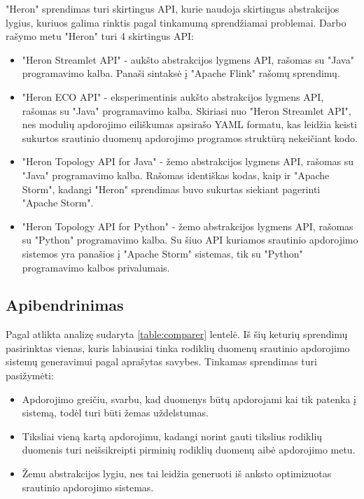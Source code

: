 \documentclass{VUMIFPSbakalaurinis}
\begin{document}
"Heron" sprendimas turi skirtingus API, kurie naudoja skirtingus abstrakcijos lygius, kuriuos galima rinktis pagal tinkamumą sprendžiamai problemai. Darbo rašymo metu "Heron" turi 4 skirtingus API:
\begin{itemize}
    \item "Heron Streamlet API" - aukšto abstrakcijos lygmens API, rašomas su "Java" programavimo kalba. Panaši sintaksė į "Apache Flink" rašomų sprendimų.
    \item "Heron ECO API" - eksperimentinis aukšto abstrakcijos lygmens API, rašomas su "Java" programavimo kalba. Skiriasi nuo "Heron Streamlet API", nes modulių apdorojimo eiliškumas apsirašo YAML formatu, kas leidžia keisti sukurtos srautinio duomenų apdorojimo programos struktūrą nekeičiant kodo.
    \item "Heron Topology API for Java" - žemo abstrakcijos lygmens API, rašomas su "Java" programavimo kalba. Rašomas identiškas kodas, kaip ir "Apache Storm", kadangi "Heron" sprendimas buvo sukurtas siekiant pagerinti "Apache Storm".
    \item "Heron Topology API for Python" - žemo abstrakcijos lygmens API, rašomas su "Python" programavimo kalba. Su šiuo API kuriamos srautinio apdorojimo sistemos yra panašios į "Apache Storm" sistemas, tik su "Python" programavimo kalbos privalumais.
\end{itemize}  


\subsection{Apibendrinimas}

Pagal atlikta analizę sudaryta \ref{table:comparer} lentelė. Iš šių keturių sprendimų pasirinktas vienas, kuris labiausiai tinka rodiklių duomenų srautinio apdorojimo sistemų generavimui pagal aprašytas savybes. Tinkamas sprendimas turi pasižymėti: 
\begin{itemize}
    \item Apdorojimo greičiu, svarbu, kad duomenys būtų apdorojami kai tik patenka į sistemą, todėl turi būti žemas uždelstumas.
    \item Tiksliai vieną kartą apdorojimu, kadangi norint gauti tikslius rodiklių duomenis turi neišsikreipti pirminių rodiklių duomenų aibė apdorojimo metu.
    \item Žemu abstrakcijos lygiu, nes tai leidžia generuoti iš anksto optimizuotas srautinio apdorojimo sistemas.  
\end{itemize} 
\end{document}
